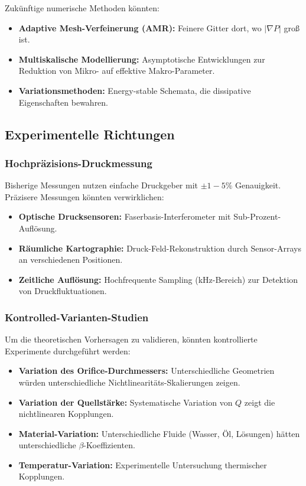\documentclass[a4paper,12pt]{article}
\theoremstyle{definition}
\begin{document}
Zukünftige numerische Methoden könnten:
\begin{itemize}
	\item \textbf{Adaptive Mesh-Verfeinerung (AMR):} Feinere Gitter dort, wo $|\nabla P|$ groß ist.
	\item \textbf{Multiskalische Modellierung:} Asymptotische Entwicklungen zur Reduktion von Mikro- auf effektive Makro-Parameter.
	\item \textbf{Variationsmethoden:} Energy-stable Schemata, die dissipative Eigenschaften bewahren.
\end{itemize}

\subsection{Experimentelle Richtungen}

\subsubsection{Hochpräzisions-Druckmessung}

Bisherige Messungen nutzen einfache Druckgeber mit $\pm 1 - 5\%$ Genauigkeit. Präzisere Messungen könnten verwirklichen:

\begin{itemize}
	\item \textbf{Optische Drucksensoren:} Faserbasis-Interferometer mit Sub-Prozent-Auflösung.
	\item \textbf{Räumliche Kartographie:} Druck-Feld-Rekonstruktion durch Sensor-Arrays an verschiedenen Positionen.
	\item \textbf{Zeitliche Auflösung:} Hochfrequente Sampling (kHz-Bereich) zur Detektion von Druckfluktuationen.
\end{itemize}

\subsubsection{Kontrolled-Varianten-Studien}

Um die theoretischen Vorhersagen zu validieren, könnten kontrollierte Experimente durchgeführt werden:

\begin{itemize}
	\item \textbf{Variation des Orifice-Durchmessers:} Unterschiedliche Geometrien würden unterschiedliche Nichtlinearitäts-Skalierungen zeigen.
	\item \textbf{Variation der Quellstärke:} Systematische Variation von $Q$ zeigt die nichtlinearen Kopplungen.
	\item \textbf{Material-Variation:} Unterschiedliche Fluide (Wasser, Öl, Lösungen) hätten unterschiedliche $\beta$-Koeffizienten.
	\item \textbf{Temperatur-Variation:} Experimentelle Untersuchung thermischer Kopplungen.
\end{itemize}
\end{document}
